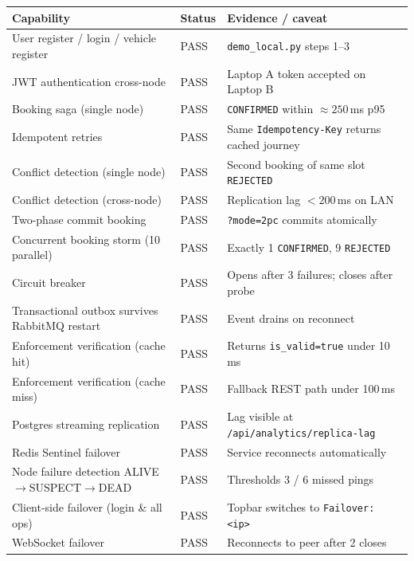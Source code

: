 \documentclass[11pt,a4paper]{article}
\begin{document}
\begin{table}[H]
\centering\footnotesize
\begin{tabularx}{\textwidth}{L{4.8cm} L{1.2cm} X}
  \toprule
  \textbf{Capability} & \textbf{Status} & \textbf{Evidence / caveat} \\
  \midrule
  User register / login / vehicle register & PASS & \texttt{demo\_local.py} steps 1--3 \\
  JWT authentication cross-node            & PASS & Laptop A token accepted on Laptop B \\
  Booking saga (single node)               & PASS & \texttt{CONFIRMED} within ${\approx}250$\,ms p95 \\
  Idempotent retries                       & PASS & Same \texttt{Idempotency-Key} returns cached journey \\
  Conflict detection (single node)         & PASS & Second booking of same slot \texttt{REJECTED} \\
  Conflict detection (cross-node)          & PASS & Replication lag ${<}200$\,ms on LAN \\
  Two-phase commit booking                 & PASS & \texttt{?mode=2pc} commits atomically \\
  Concurrent booking storm (10 parallel)   & PASS & Exactly 1 \texttt{CONFIRMED}, 9 \texttt{REJECTED} \\
  Circuit breaker                          & PASS & Opens after 3 failures; closes after probe \\
  Transactional outbox survives RabbitMQ restart & PASS & Event drains on reconnect \\
  Enforcement verification (cache hit)     & PASS & Returns \texttt{is\_valid=true} under 10\,ms \\
  Enforcement verification (cache miss)    & PASS & Fallback REST path under 100\,ms \\
  Postgres streaming replication           & PASS & Lag visible at \texttt{/api/analytics/replica-lag} \\
  Redis Sentinel failover                  & PASS & Service reconnects automatically \\
  Node failure detection ALIVE$\to$SUSPECT$\to$DEAD & PASS & Thresholds 3 / 6 missed pings \\
  Client-side failover (login \& all ops)  & PASS & Topbar switches to \texttt{Failover: <ip>} \\
  WebSocket failover                       & PASS & Reconnects to peer after 2 closes \\

\end{tabularx}
\end{table}
\end{document}
